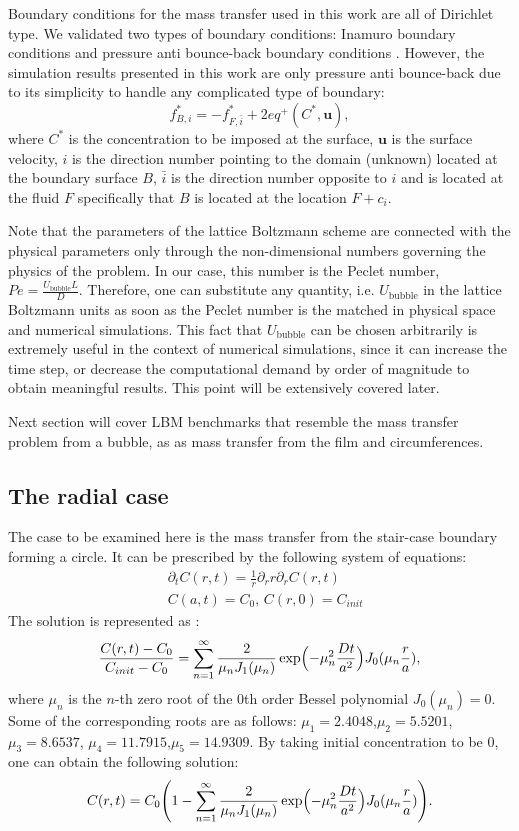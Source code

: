 \documentclass{article}
\newcommand{\beq}{\begin{equation}}
\newcommand{\feq}{\end{equation}}
\newcommand{\ububble}{U_{\mathrm{bubble}}}
\newcommand{\cstar}{C^{*}}
\begin{document}
Boundary conditions for the mass transfer used in this work are all of Dirichlet type. We validated
two types of boundary conditions: Inamuro boundary conditions \cite{inamuro-scalar-boundary} and
pressure anti bounce-back boundary conditions \cite{ginzburg-multireflection}. However, the
simulation results presented in this work are only pressure anti bounce-back due to its simplicity
to handle any complicated type of boundary:
\beq
\label{antibb}
f^{*}_{B,i}=-f^{*}_{F,\bar{i}} + 2 eq^+(\cstar,\bm{u}),
\feq
where $\cstar$ is the concentration to be imposed at the surface, $\bm{u}$ is the surface velocity,
$i$ is the direction number pointing to the domain (unknown) located at the boundary surface $B$,
$\bar{i}$ is the direction number opposite to $i$ and is located at the fluid $F$ specifically that
$B$ is located at the location $F+c_i$. 

Note that the parameters of the lattice
Boltzmann scheme are connected with the physical parameters only through the non-dimensional
numbers governing the physics of the problem. In our case, this number is the Peclet number, $Pe=\frac{\ububble L}{D}$.
Therefore, one can substitute any quantity, i.e.
$\ububble$ in the lattice Boltzmann units as soon as the
Peclet number is the matched in physical space and numerical simulations. This fact that $\ububble$
can be chosen arbitrarily is extremely useful in the context of numerical simulations, since it can
increase the time step, or decrease the computational demand by order of magnitude to obtain
meaningful results. This point will be extensively covered later. 

Next section will cover LBM benchmarks that resemble the mass transfer problem from a bubble, as as
mass transfer from the film  and circumferences.

\subsection{The radial case}
The case to be examined here is the mass transfer from the stair-case boundary forming a circle. It
can be
prescribed by the following system of equations:
\beq
\begin{aligned}
&\partial_t C(r,t)=\frac{1}{r}\partial_r r \partial_r C(r,t)\\
&C(a,t)=C_0,\,C(r,0)=C_{init}
\end{aligned}
\feq 
The solution is represented as \cite{chemical-correlations}:
\beq
\frac{C(r,t)-C_{0}}{C_{init}-C_{0}}=\sum_{n=1}^{\infty}{\frac{2}{\mu_n
J_1(\mu_n)}\exp\Bigl(-\mu_n^2 \frac{D t}{a^2} \Bigr)J_0(\mu_n \frac{r}{a})},
\feq
where $\mu_n$ is the $n$-th zero root of the $0$th order Bessel polynomial $J_0(\mu_n)=0$. Some of
the corresponding roots are as follows: $\mu_1=2.4048$,$\mu_2=5.5201$,$\mu_3=8.6537$,
$\mu_4=11.7915$,$\mu_5=14.9309$.
By taking initial concentration to be $0$, one can obtain the following solution:
\beq
C(r,t)=C_0 \Biggl(1 - \sum_{n=1}^{\infty}{\frac{2}{\mu_n
J_1(\mu_n)}\exp\Bigl(-\mu_n^2 \frac{D t}{a^2} \Bigr)J_0(\mu_n \frac{r}{a})}\Biggr).
\feq
\end{document}

